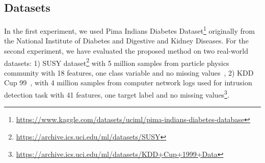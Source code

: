 \subsection{Datasets}
In the first experiment, we used Pima Indians Diabetes Dataset\footnote{\url{https://www.kaggle.com/datasets/uciml/pima-indians-diabetes-database}} originally from the National Institute of Diabetes and Digestive and Kidney Diseases. 
For the second experiment, we have evaluated the proposed method on two real-world datasets: 1) SUSY dataset\footnote{\url{https://archive.ics.uci.edu/ml/datasets/SUSY}} with 5 million samples from particle physics community with 18 features, one class variable and no missing values~\cite{susy}, 
2) KDD Cup 99~\cite{kdd}, with 4 million samples from computer network logs used for intrusion detection task with 41 features, one target label and no missing values\footnote{\url{https://archive.ics.uci.edu/ml/datasets/KDD+Cup+1999+Data}}.


